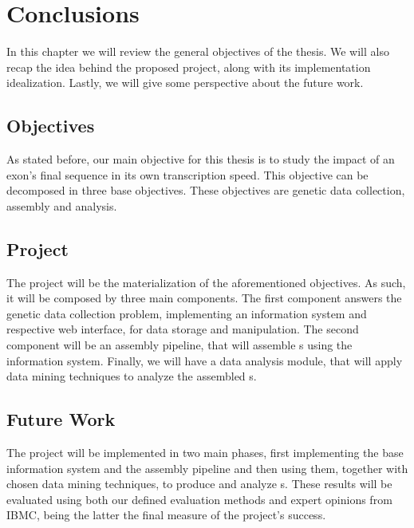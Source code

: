 \chapter{Conclusions}\label{chap:conclusions}

In this chapter we will review the general objectives of the thesis. We will
also recap the idea behind the proposed project, along with its implementation
idealization. Lastly, we will give some perspective about the future work.

\section{Objectives}

As stated before, our main objective for this thesis is to study the impact of
an exon's final sequence in its own transcription speed. This objective can be
decomposed in three base objectives. These objectives are genetic data
collection, \trans{} assembly and \trans{} analysis.

\section{Project}

The project will be the materialization of the aforementioned objectives. As
such, it will be composed by three main components. The first component answers
the genetic data collection problem, implementing an information system and
respective web interface, for data storage and manipulation. The second
component will be an assembly pipeline, that will assemble \trans s using the
information system. Finally, we will have a data analysis module, that will
apply data mining techniques to analyze the assembled \trans s.

\section{Future Work}

The project will be implemented in two main phases, first implementing the base
information system and the assembly pipeline and then using them, together with
chosen data mining techniques, to produce and analyze \trans s. These results
will be evaluated using both our defined evaluation methods and expert opinions
from IBMC, being the latter the final measure of the project's success.
